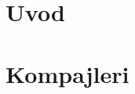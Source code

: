 \documentclass[12pt,oneside]{memoir}
\begin{document}
\frontmatter
\naslovna
\komisija
\posveta{}
\apstrakt
\tableofcontents*

\mainmatter

\chapter{Uvod}

\chapter{Kompajleri}




\end{document}
